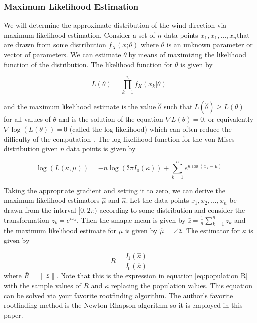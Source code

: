 \documentclass[12pt]{article}
\numberwithin{equation}{section}
\numberwithin{figure}{section}
\begin{document}
\subsubsection{Maximum Likelihood Estimation}

We will determine the approximate distribution of the wind direction via maximum likelihood estimation. Consider a set of $n$ data points $ x_1, x_1, ...,x_n $that are drawn from some distribution $f_X(x;\theta)$ where $\theta$ is an unknown parameter or vector of parameters. We can estimate $\theta$ by means of maximizing the likelihood function of the distribution. The likelihood function for $\theta$ is given by

\begin{equation}\label{eq:likelihood fn}
L(\theta) = \prod_{k=1}^n f_X(x_k|\theta)
\end{equation}

and the maximum likelihood estimate is the value $\hat{\theta}$ such that $L(\hat{\theta}) \ge L(\theta)$ for all values of $\theta$ and is the solution of the equation $\nabla L(\theta) = 0$, or equivalently $\nabla \log(L(\theta)) = 0$ (called the log-likelihood) which can often reduce the difficulty of the computation \cite{Larsen}. The log-likelihood function for the von Mises distribution given $n$ data points is given by 

\begin{equation}\label{eq:vmll}
\log(L(\kappa, \mu)) = -n\log( 2\pi I_0(\kappa))+ \sum_{k=1}^n e^{\kappa \cos(x_k-\mu)}
\end{equation}

Taking the appropriate gradient and setting it to zero, we can derive the maximum likelihood estimators $\hat{\mu}$ and $\hat{\kappa}$. Let the data points $x_1, x_2, ..., x_n$ be drawn from the interval $[0,2\pi)$ according to some distribution and consider the transformation $z_k = e^{i x_k}$. Then the smaple mean is given by $\bar{z} =\frac{1}{n}\sum_{k=1}^n z_k$ and the maximum likelihood estimate for $\mu$ is given by $\hat{\mu} = \angle\bar{z}$. The estimator for $\kappa$ is given by \cite{borradaile}

\begin{equation}
\label{eq:kmle}
\bar{R} = \frac{I_1(\hat{\kappa})}{I_0(\hat{\kappa})}
\end{equation}
where $\bar{R} = \|\bar{z}\|$. Note that this is the expression in equation  \ref{eq:population R} with the sample values of $R$ and $\kappa$ replacing the population values. This equation can be solved via your favorite rootfinding algorithm. The author's favorite rootfinding method is the Newton-Rhapson algorithm so it is employed in this paper. 
\end{document}
